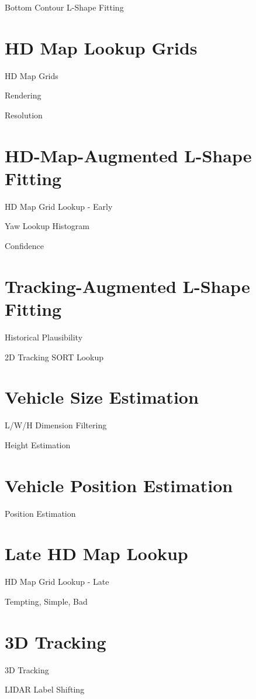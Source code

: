 Bottom Contour L-Shape Fitting


\section{HD Map Lookup Grids}
\label{sec:hdmapgrids}

HD Map Grids \par
Rendering \par
Resolution


\section{HD-Map-Augmented L-Shape Fitting}
\label{sec:hdmaplsf}

HD Map Grid Lookup - Early \par
Yaw Lookup Histogram \par
Confidence


\section{Tracking-Augmented L-Shape Fitting}
\label{sec:trackinglsf}

Historical Plausibility \par
2D Tracking SORT Lookup


\section{Vehicle Size Estimation}
\label{sec:size}

L/W/H Dimension Filtering \par
Height Estimation


\section{Vehicle Position Estimation}
\label{sec:pos}

Position Estimation


\section{Late HD Map Lookup}
\label{sec:hdmaplate}

HD Map Grid Lookup - Late \par
Tempting, Simple, Bad


\section{3D Tracking}
\label{sec:trackthreed}

3D Tracking \par
LIDAR Label Shifting
